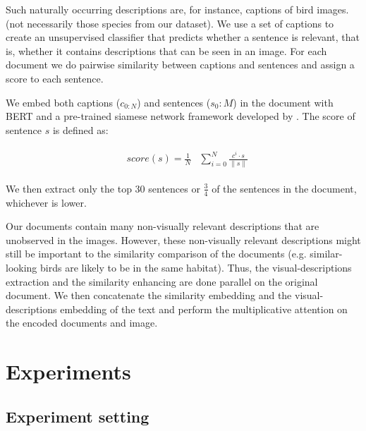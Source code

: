 \documentclass[11pt,a4paper]{article}
\begin{document}
Such naturally occurring descriptions are, for instance, captions of bird images. (not necessarily those species from our dataset). We use a set of captions to create an unsupervised classifier that predicts whether a sentence is relevant, that is, whether it contains descriptions that can be seen in an image.
For each document we do pairwise similarity between captions and sentences and assign a score to each sentence.

We embed both captions ($c_{0:N}$) and sentences ($s_0:M$) in the document with BERT \cite{devlin2019bert} and a pre-trained siamese network framework developed by \citet{reimers2019sentence}. The score of sentence $s$ is defined as:

\begin{equation}
\begin{aligned}
\begin{split}
\label{eq:score}
&score(s)=  \frac{1}{N}
&\sum_{i=0}^{N} \frac{c^i\cdot s}{\| s\| }
\end{split}
\end{aligned}
\end{equation}

 We then extract only the top 30 sentences or $\frac{3}{4}$ of the sentences in the document, whichever is lower.\par   

\par




Our documents contain many non-visually relevant descriptions that are unobserved in the images. However, these non-visually relevant descriptions might still be important to the similarity comparison of the documents (e.g. similar-looking birds are likely to be in the same habitat). Thus, the visual-descriptions extraction and the similarity enhancing are done parallel on the original document. We then concatenate the similarity embedding and the visual-descriptions embedding of the text and perform the multiplicative attention on the encoded documents and image.

\section{Experiments}

\subsection{Experiment setting}
\end{document}
